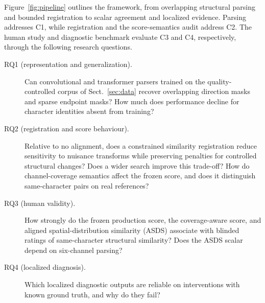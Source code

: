 Figure~\ref{fig:pipeline} outlines the framework, from overlapping structural
parsing and bounded registration to scalar agreement and localized evidence.
Parsing addresses C1, while registration and the score-semantics audit
address C2. The human study and diagnostic benchmark evaluate C3 and C4,
respectively, through the following research questions.
\begin{description}
  \item[RQ1 (representation and generalization).] Can convolutional and
  transformer parsers trained on the quality-controlled corpus of
  Sect.~\ref{sec:data} recover overlapping direction masks and sparse
  endpoint masks? How much does performance decline for character identities
  absent from training?
  \item[RQ2 (registration and score behaviour).] Relative to no alignment,
  does a constrained similarity registration reduce sensitivity to nuisance
  transforms while preserving penalties for controlled structural changes?
  Does a wider search improve this trade-off? How do channel-coverage
  semantics affect the frozen score, and does it distinguish same-character
  pairs on real references?
  \item[RQ3 (human validity).] How strongly do the frozen production score,
  the coverage-aware score, and aligned spatial-distribution similarity
  (ASDS) associate with blinded ratings of same-character structural
  similarity? Does the ASDS scalar depend on six-channel parsing?
  \item[RQ4 (localized diagnosis).] Which localized diagnostic outputs are
  reliable on interventions with known ground truth, and why do they fail?
\end{description}


